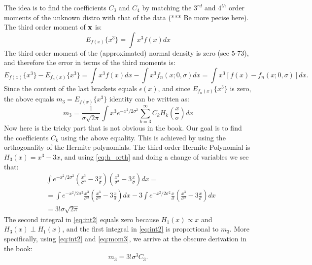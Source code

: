 \documentclass[a4paper]{book}
\begin{document}
The idea is to find the coefficients $C_3$ and $C_4$ by matching the $3^{rd}$ and $4^{th}$ order moments of the unknown distro with that of the data (*** Be more pecise here). The third order moment of $\mathbf{x}$ is:
%
\begin{equation}
E_{f(x)}\{x^3\} = \int x^3 f(x) dx
\end{equation}
%
The third order moment of the (approximated) normal density is zero (see 5-73), and therefore the error in terms of the third moments is:
\begin{equation}
E_{f(x)}\{x^3\} - E_{f_n(x)}\{x^3\} = \int x^3 f(x) dx - \int x^3 f_n(x; 0, \sigma) dx = \int x^3\left[f(x)-f_n(x; 0, \sigma)\right] dx.
\end{equation}
Since the content of the last brackets equals $\epsilon(x)$, and since $ E_{f_n(x)}\{x^3\}$ is zero, the above equals $m_3 = E_{f(x)}\{x^3\}$ identity can be written as:
%
\begin{equation}
m_3 = \frac{1}{\sigma \sqrt{2\pi}} \int x^3 e^{-x^2/2\sigma^2}\sum\limits_{k=3}^\infty C_k H_k\left(\frac{x}{\sigma}\right) dx \label{eq:mom3}
\end{equation}
%
Now here is the tricky part that is not obvious in the book. Our goal is to find the coefficients $C_k$ using the above equality. This is achieved by using the orthogonality of the Hermite polynomials. The third order Hermite Polynomial is $H_3(x) = x^3-3x$, and using \eqref{eq:h_orth} and doing a change of variables we see that:
%
\begin{align}
&\int e^{-x^2/2\sigma^2} \left(\frac{x^3}{\sigma^3}-3\frac{x}{\sigma}\right)\left(\frac{x^3}{\sigma^3}-3\frac{x}{\sigma}\right)dx = \\
&=\int e^{-x^2/2\sigma^2} \frac{x^3}{\sigma^3}\left(\frac{x^3}{\sigma^3}-3\frac{x}{\sigma}\right)dx -3\int e^{-x^2/2\sigma^2} \frac{x}{\sigma}\left(\frac{x^3}{\sigma^3}-3\frac{x}{\sigma}\right)dx \label{eq:int2}\\
&=3!\sigma \sqrt{2\pi}
\end{align}
%
The second integral in \eqref{eq:int2} equals zero because $H_1(x)\propto x$ and $H_3(x)\perp H_1(x)$, and the first integral in \eqref{eq:int2} is proportional to $m_3$. More specifically, using \eqref{eq:int2} and \eqref{eq:mom3}, we arrive at the obscure derivation in the book:
%
\begin{equation}
m_3 = 3! \sigma^3 C_3.
\end{equation}








\end{document}
